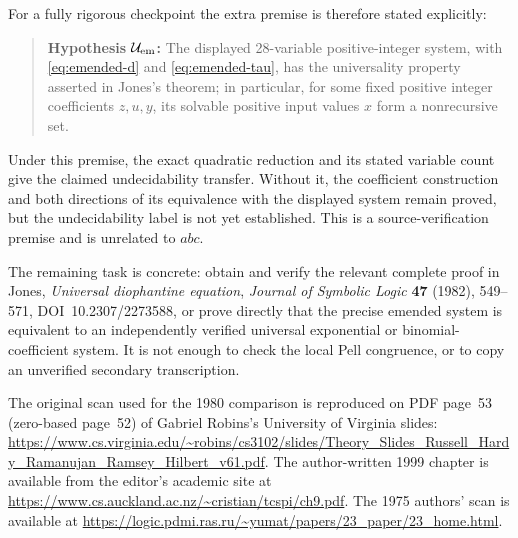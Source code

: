 \documentclass[11pt]{article}
\begin{document}
For a fully rigorous checkpoint the extra premise is therefore stated
explicitly:
\begin{quote}
\textbf{Hypothesis $\mathcal U_{\rm em}$:}
The displayed 28-variable positive-integer system, with
\eqref{eq:emended-d} and \eqref{eq:emended-tau}, has the universality
property asserted in Jones's theorem; in particular, for some fixed
positive integer coefficients $z,u,y$, its solvable positive input
values $x$ form a nonrecursive set.
\end{quote}
Under this premise, the exact quadratic reduction and its stated
variable count give the claimed undecidability transfer.  Without it,
the coefficient construction and both directions of its equivalence
with the displayed system remain proved, but the undecidability label
is not yet established.  This is a source-verification premise and is
unrelated to $abc$.

The remaining task is concrete: obtain and verify the relevant complete
proof in Jones, \emph{Universal diophantine equation},
\emph{Journal of Symbolic Logic} \textbf{47} (1982), 549--571,
DOI~10.2307/2273588, or prove directly that the precise emended system is
equivalent to an independently verified universal exponential or
binomial-coefficient system.  It is not enough to check the local Pell
congruence, or to copy an unverified secondary transcription.

The original scan used for the 1980 comparison is reproduced on PDF
page~53 (zero-based page~52) of Gabriel Robins's University of Virginia
slides:
\url{https://www.cs.virginia.edu/~robins/cs3102/slides/Theory_Slides_Russell_Hardy_Ramanujan_Ramsey_Hilbert_v61.pdf}.
The author-written 1999 chapter is available from the editor's academic
site at
\url{https://www.cs.auckland.ac.nz/~cristian/tcspi/ch9.pdf}.
The 1975 authors' scan is available at
\url{https://logic.pdmi.ras.ru/~yumat/papers/23_paper/23_home.html}.
\end{document}
